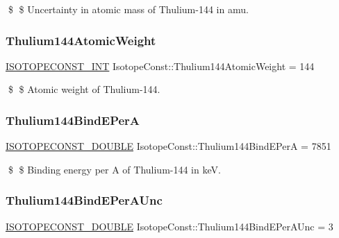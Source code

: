\$ \$ Uncertainty in atomic mass of Thulium-\/144 in amu. \mbox{\label{group___isotope_const-_thulium-_tm144_ga9007e5e626f602985142969fbabb28a3}} 
\subsubsection{\texorpdfstring{Thulium144\+Atomic\+Weight}{Thulium144AtomicWeight}}
{\footnotesize\ttfamily \mbox{\hyperlink{group___isotope_const-_macros_ga5f18360b3e99483a35c32d789e62621c}{I\+S\+O\+T\+O\+P\+E\+C\+O\+N\+S\+T\+\_\+\+I\+NT}} Isotope\+Const\+::\+Thulium144\+Atomic\+Weight = 144}

\$ \$ Atomic weight of Thulium-\/144. \mbox{\label{group___isotope_const-_thulium-_tm144_gaa45a84099daa329888de0315fecfb880}} 
\subsubsection{\texorpdfstring{Thulium144\+Bind\+E\+PerA}{Thulium144BindEPerA}}
{\footnotesize\ttfamily \mbox{\hyperlink{group___isotope_const-_macros_ga8f45a7272ce02c0b4c65c44636ed719a}{I\+S\+O\+T\+O\+P\+E\+C\+O\+N\+S\+T\+\_\+\+D\+O\+U\+B\+LE}} Isotope\+Const\+::\+Thulium144\+Bind\+E\+PerA = 7851}

\$ \$ Binding energy per A of Thulium-\/144 in keV. \mbox{\label{group___isotope_const-_thulium-_tm144_ga8f606316af39839c103dd53ed9ad4283}} 
\subsubsection{\texorpdfstring{Thulium144\+Bind\+E\+Per\+A\+Unc}{Thulium144BindEPerAUnc}}
{\footnotesize\ttfamily \mbox{\hyperlink{group___isotope_const-_macros_ga8f45a7272ce02c0b4c65c44636ed719a}{I\+S\+O\+T\+O\+P\+E\+C\+O\+N\+S\+T\+\_\+\+D\+O\+U\+B\+LE}} Isotope\+Const\+::\+Thulium144\+Bind\+E\+Per\+A\+Unc = 3}

